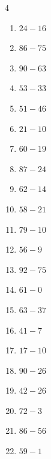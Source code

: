 \begin{multicols}{4}
\begin{enumerate}
\columnbreak %

  \item $24-16$
        \phantom{$=8$}

  \item $86-75$
        \phantom{$=11$}

  \item $90-63$
        \phantom{$=27$}

  \item $53-33$
        \phantom{$=20$}

  \item $51-46$
        \phantom{$=5$}

  \item $21-10$
        \phantom{$=11$}

  \item $60-19$
        \phantom{$=41$}

  \item $87-24$
        \phantom{$=63$}

  \item $62-14$
        \phantom{$=48$}

  \item $58-21$
        \phantom{$=37$}

  \item $79-10$
        \phantom{$=69$}

  \item $56-9$
        \phantom{$=47$}

  \item $92-75$
        \phantom{$=17$}

  \item $61-0$
        \phantom{$=61$}

  \item $63-37$
        \phantom{$=26$}

  \item $41-7$
        \phantom{$=34$}

  \item $17-10$
        \phantom{$=7$}

  \item $90-26$
        \phantom{$=64$}

  \item $42-26$
        \phantom{$=16$}

  \item $72-3$
        \phantom{$=69$}

  \item $86-56$
        \phantom{$=30$}

  \item $59-1$
        \phantom{$=58$}


\end{enumerate}
\end{multicols}
